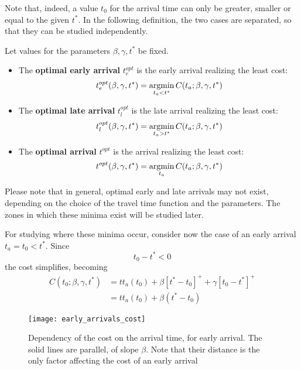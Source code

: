 Note that, indeed, a value \(t_0\) for the arrival time can only be greater,
smaller or equal to the given \(t^*\).
In the following definition,
the two cases are separated, so that they can be studied independently.
\begin{definition}
  Let values for the parameters \(\beta, \gamma, t^*\) be fixed.
  \begin{itemize}
  \item The \textbf{optimal early arrival} \(t_e^{opt}\) is the early arrival realizing the least cost:
    \begin{equation*}
      t_e^{opt}(\beta, \gamma ,t^*) = \operatorname*{argmin}_{t_a < t^*}C(t_a; \beta, \gamma, t^*)
    \end{equation*}
  \item The \textbf{optimal late arrival} \(t_l^{opt}\) is the late arrival realizing the least cost:
    \begin{equation*}
      t_l^{opt}(\beta, \gamma ,t^*) = \operatorname*{argmin}_{t_a > t^*}C(t_a; \beta, \gamma, t^*)
    \end{equation*}
  \item The \textbf{optimal arrival} \(t^{opt}\) is the arrival realizing the least cost:
    \begin{equation*}
      t^{opt}(\beta, \gamma ,t^*) = \operatorname*{argmin}_{t_a}C(t_a; \beta, \gamma, t^*)
    \end{equation*}
  \end{itemize}
\end{definition}

Please note that in general,
optimal early and late arrivals may not exist,
depending on the choice of the travel time function and the parameters.
The zones in which these minima exist will be studied later.

For studying where these minima occur, consider now the case of an early arrival \(t_a = t_0 < t^*\).
Since
\begin{equation*}
  t_0 - t^* < 0
\end{equation*}
the cost simplifies, becoming
\begin{align}
  C(t_0; \beta, \gamma, t^*) & = tt_a(t_0) + \beta[t^*- t_0]^+ + \gamma[t_0 - t^*]^+ \nonumber \\
                             & = tt_a(t_0) + \beta(t^*- t_0)\label{eq:cost_early}
\end{align}

\begin{figure}
  \centering
  \texttt{[image: early\_arrivals\_cost]}
  \caption{Dependency of the cost on the arrival time, for early arrival.
    The solid lines are parallel, of slope \(\beta\).
  Note that their distance is the only factor affecting the cost of an early arrival}
  \label{fig:early_arrivals_cost}
\end{figure}


